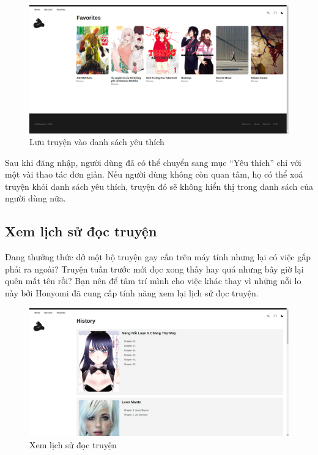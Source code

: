 \documentclass[./../main.tex]{subfiles}
\begin{document}
\begin{figure}[!htb]
	\centering
	\includegraphics[width=\linewidth]{./images/favorite.png}
	\caption{Lưu truyện vào danh sách yêu thích}
\end{figure}

Sau khi đăng nhập, người dùng đã có thể chuyển sang mục “Yêu thích” chỉ với một vài thao tác đơn giản. Nếu người dùng không còn quan tâm, họ có thể xoá truyện khỏi danh sách yêu thích, truyện đó sẽ không hiển thị trong danh sách của người dùng nữa.
\subsection{Xem lịch sử đọc truyện}
Đang thưởng thức dở một bộ truyện gay cấn trên máy tính nhưng lại có việc gấp phải ra ngoài? Truyện tuần trước mới đọc xong thấy hay quá nhưng bây giờ lại quên mất tên rồi? Bạn nên để tâm trí mình cho việc khác thay vì những nỗi lo này bởi Honyomi đã cung cấp tính năng xem lại lịch sử đọc truyện.


\begin{figure}[!htb]
	\centering
	\includegraphics[width=\linewidth]{./images/history.png}
	\caption{Xem lịch sử đọc truyện}
\end{figure}
\end{document}
